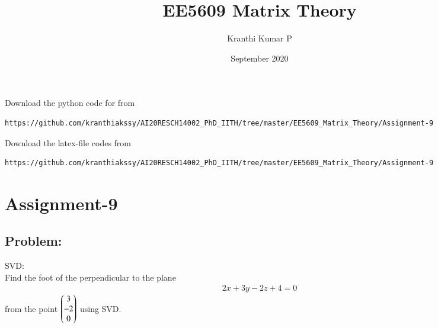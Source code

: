 \documentclass[journal,12pt,twocolumn]{IEEEtran}
\begin{document}
     \def\rightbox#1{\makebox[0in][r]{#1}}
     \def\centbox#1{\makebox[0in]{#1}}
     \def\topbox#1{\raisebox{-\baselineskip}[0in][0in]{#1}}
     \def\midbox#1{\raisebox{-0.5\baselineskip}[0in][0in]{#1}}
\vspace{3cm}
\title{EE5609 Matrix Theory}
\author{Kranthi Kumar P}
\date{September 2020}
\maketitle
\newpage
\bigskip
\renewcommand{\thefigure}{\theenumi}
\renewcommand{\thetable}{\theenumi}
Download the python code for from 
\begin{lstlisting}
https://github.com/kranthiakssy/AI20RESCH14002_PhD_IITH/tree/master/EE5609_Matrix_Theory/Assignment-9
\end{lstlisting}

Download the latex-file codes from 
%
\begin{lstlisting}
https://github.com/kranthiakssy/AI20RESCH14002_PhD_IITH/tree/master/EE5609_Matrix_Theory/Assignment-9
\end{lstlisting}
\section*{Assignment-9}
\subsection*{Problem:}
SVD:\\
Find the foot of the perpendicular to the plane
\begin{align}
2x+3y-2z+4 = 0 \label{eq:equation}
\end{align}
from the point $\begin{pmatrix}3\\-2\\0\end{pmatrix}$ using SVD.
\end{document}
